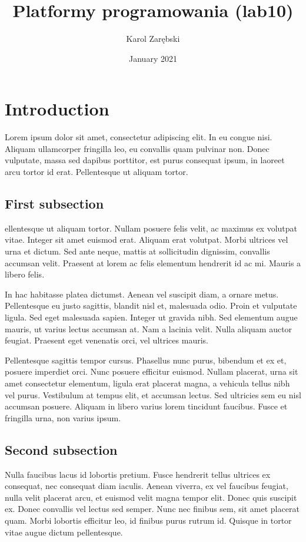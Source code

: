 \documentclass{article}
\title{\huge{\textbf{Platformy programowania (lab10)}}}
\author{Karol Zarębski}
\date{January 2021}
\begin{document}
\begin{titlepage}
\maketitle
\end{titlepage}

\tableofcontents

\newpage
\section{Introduction}
Lorem ipsum dolor sit amet, consectetur adipiscing elit. In eu congue nisi. Aliquam ullamcorper fringilla leo, eu convallis quam pulvinar non. Donec vulputate, massa sed dapibus porttitor, est purus consequat ipsum, in laoreet arcu tortor id erat. Pellentesque ut aliquam tortor.

\subsection{First subsection}
ellentesque ut aliquam tortor. Nullam posuere felis velit, ac maximus ex volutpat vitae. Integer sit amet euismod erat. Aliquam erat volutpat. Morbi ultrices vel urna et dictum. Sed ante neque, mattis at sollicitudin dignissim, convallis accumsan velit. Praesent at lorem ac felis elementum hendrerit id ac mi. Mauris a libero felis.

In hac habitasse platea dictumst. Aenean vel suscipit diam, a ornare metus. Pellentesque eu justo sagittis, blandit nisl et, malesuada odio. Proin et vulputate ligula. Sed eget malesuada sapien. Integer ut gravida nibh. Sed elementum augue mauris, ut varius lectus accumsan at. Nam a lacinia velit. Nulla aliquam auctor feugiat. Praesent eget venenatis orci, vel ultrices mauris.

Pellentesque sagittis tempor cursus. Phasellus nunc purus, bibendum et ex et, posuere imperdiet orci. Nunc posuere efficitur euismod. Nullam placerat, urna sit amet consectetur elementum, ligula erat placerat magna, a vehicula tellus nibh vel purus. Vestibulum at tempus elit, et accumsan lectus. Sed ultricies sem eu nisl accumsan posuere. Aliquam in libero varius lorem tincidunt faucibus. Fusce et fringilla urna, non varius ipsum.

\subsection{Second subsection}
Nulla faucibus lacus id lobortis pretium. Fusce hendrerit tellus ultrices ex consequat, nec consequat diam iaculis. Aenean viverra, ex vel faucibus feugiat, nulla velit placerat arcu, et euismod velit magna tempor elit. Donec quis suscipit ex. Donec convallis vel lectus sed semper. Nunc nec finibus sem, sit amet placerat quam. Morbi lobortis efficitur leo, id finibus purus rutrum id. Quisque in tortor vitae augue dictum pellentesque.
\end{document}
